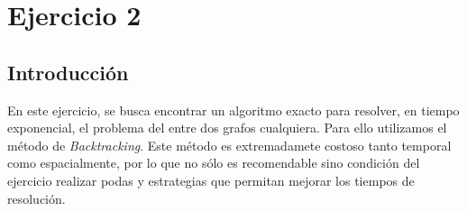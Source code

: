 \section{Ejercicio 2}


\subsection{Introducción}
En este ejercicio, se busca encontrar un algoritmo exacto para resolver, en
tiempo exponencial, el problema del  entre dos grafos cualquiera.
Para ello utilizamos el método de \textit{Backtracking}. Este método es
extremadamete costoso tanto temporal como espacialmente, por lo que no sólo
es recomendable sino condición del ejercicio realizar podas y estrategias que
permitan mejorar los tiempos de resolución.

